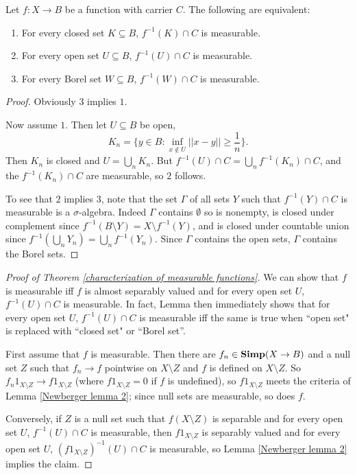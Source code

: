 \begin{lemma}
\label{Newberger lemma 3}
Let $f: X \to B$ be a function with carrier $C$. The following are equivalent:
\begin{enumerate}
\item For every closed set $K \subseteq B$, $f^{-1}(K) \cap C$ is measurable.
\item For every open set $U \subseteq B$, $f^{-1}(U) \cap C$ is measurable.
\item For every Borel set $W \subseteq B$, $f^{-1}(W) \cap C$ is measurable.
\end{enumerate}
\end{lemma}
\begin{proof}
Obviously $3$ implies $1$.

Now assume $1$. Then let $U \subseteq B$ be open,
\[K_{n} = \{y \in B: \inf_{x \notin U} ||x - y|| \geq \frac{1}{n}\}.\]
Then $K_{n}$ is closed and $U = \bigcup_{n} K_{n}$. But $f^{-1}(U) \cap C = \bigcup_{n} f^{-1}(K_{n}) \cap C$, and the $f^{-1}(K_{n}) \cap C$ are measurable, so $2$ follows.

To see that $2$ implies $3$, note that the set $\Gamma$ of all sets $Y$ such that $f^{-1}(Y) \cap C$ is measurable is a $\sigma$-algebra.
Indeed $\Gamma$ contains $\emptyset$ so is nonempty, is closed under complement since $f^{-1}(B \setminus Y) = X \setminus f^{-1}(Y)$, and is closed under countable union since $f^{-1}(\bigcup_{n} Y_{n}) = \bigcup_{n} f^{-1}(Y_{n})$.
Since $\Gamma$ contains the open sets, $\Gamma$ contains the Borel sets.
\end{proof}

\begin{proof}[Proof of Theorem \ref{characterization of measurable functions}]
We can show that $f$ is measurable iff $f$ is almost separably valued and for every open set $U$, $f^{-1}(U) \cap C$ is measurable.
In fact, Lemma \label{Newberger lemma 3} then immediately shows that for every open set $U$, $f^{-1}(U) \cap C$ is measurable iff the same is true when ``open set" is replaced with ``closed set" or ``Borel set''.

First assume that $f$ is measurable. Then there are $f_{n} \in \mathbf{Simp}(X \to B)$ and a null set $Z$ such that $f_{n} \to f$ pointwise on $X \setminus Z$ and $f$ is defined on $X \setminus Z$.
So $f_{n}1_{X \setminus Z} \to f1_{X \setminus Z}$ (where $f1_{X \setminus Z} = 0$ if $f$ is undefined), so $f1_{X \setminus Z}$ meets the criteria of Lemma \ref{Newberger lemma 2}; since null sets are measurable, so does $f$.

Conversely, if $Z$ is a null set such that $f(X \setminus Z)$ is separable and for every open set $U$, $f^{-1}(U) \cap C$ is measurable, then $f1_{X \setminus Z}$ is separably valued and for every open set $U$, $(f1_{X \setminus Z})^{-1}(U) \cap C$ is measurable, so Lemma \ref{Newberger lemma 2} implies the claim.
\end{proof}

